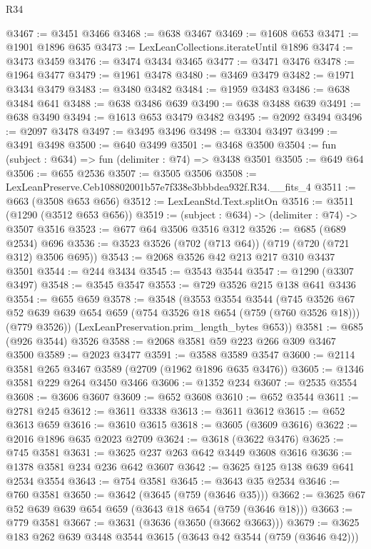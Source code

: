 \begin{lexlean}{R34}
\begin{coremodule}
@3467 := @3451 @3466
@3468 := @638 @3467
@3469 := @1608 @653
@3471 := @1901 @1896 @635
@3473 := LexLeanCollections.iterateUntil @1896
@3474 := @3473 @3459
@3476 := @3474 @3434 @3465
@3477 := @3471 @3476
@3478 := @1964 @3477
@3479 := @1961 @3478
@3480 := @3469 @3479
@3482 := @1971 @3434 @3479
@3483 := @3480 @3482
@3484 := @1959 @3483
@3486 := @638 @3484 @641
@3488 := @638 @3486 @639
@3490 := @638 @3488 @639
@3491 := @638 @3490
@3494 := @1613 @653 @3479 @3482
@3495 := @2092 @3494
@3496 := @2097 @3478
@3497 := @3495 @3496
@3498 := @3304 @3497
@3499 := @3491 @3498
@3500 := @640 @3499
@3501 := @3468 @3500
@3504 := fun (subject : @634) => fun (delimiter : @74) => @3438 @3501
@3505 := @649 @64
@3506 := @655 @2536
@3507 := @3505 @3506
@3508 := LexLeanPreserve.Ceb108802001b57e7f338e3bbbdea932f.R34.__fits_4
@3511 := @663 (@3508 @653 @656)
@3512 := LexLeanStd.Text.splitOn
@3516 := @3511 (@1290 (@3512 @653 @656))
@3519 := (subject : @634) -> (delimiter : @74) -> @3507 @3516
@3523 := @677 @64 @3506 @3516 @312
@3526 := @685 (@689 @2534) @696
@3536 := @3523 @3526 (@702 (@713 @64)) (@719 (@720 (@721 @312) @3506 @695))
@3543 := @2068 @3526 @42 @213 @217 @310 @3437 @3501
@3544 := @244 @3434
@3545 := @3543 @3544
@3547 := @1290 (@3307 @3497)
@3548 := @3545 @3547
@3553 := @729 @3526 @215 @138 @641 @3436
@3554 := @655 @659
@3578 := @3548
    (@3553
      @3554
      @3544
      (@745
        @3526
        @67
        @52
        @639
        @639
        @654
        @659
        (@754 @3526 @18 @654 (@759 (@760 @3526 @18)))
        (@779 @3526))
      (LexLeanPreservation.prim_length_bytes @653))
@3581 := @685 (@926 @3544) @3526
@3588 := @2068 @3581 @59 @223 @266 @309 @3467 @3500
@3589 := @2023 @3477
@3591 := @3588 @3589 @3547
@3600 := @2114 @3581 @265 @3467 @3589 (@2709 (@1962 @1896 @635 @3476))
@3605 := @1346 @3581 @229 @264 @3450 @3466
@3606 := @1352 @234
@3607 := @2535 @3554
@3608 := @3606 @3607
@3609 := @652 @3608
@3610 := @652 @3544
@3611 := @2781 @245
@3612 := @3611 @3338
@3613 := @3611 @3612
@3615 := @652 @3613 @659
@3616 := @3610 @3615
@3618 := @3605 (@3609 @3616)
@3622 := @2016 @1896 @635 @2023 @2709
@3624 := @3618 (@3622 @3476)
@3625 := @745 @3581
@3631 := @3625 @237 @263 @642 @3449 @3608 @3616
@3636 := @1378 @3581 @234 @236 @642 @3607
@3642 := @3625 @125 @138 @639 @641 @2534 @3554
@3643 := @754 @3581
@3645 := @3643 @35 @2534
@3646 := @760 @3581
@3650 := @3642 (@3645 (@759 (@3646 @35)))
@3662 := @3625 @67 @52 @639 @639 @654 @659 (@3643 @18 @654 (@759 (@3646 @18)))
@3663 := @779 @3581
@3667 := @3631 (@3636 (@3650 (@3662 @3663)))
@3679 := @3625 @183 @262 @639 @3448 @3544 @3615 (@3643 @42 @3544 (@759 (@3646 @42)))

\end{coremodule}
\end{lexlean}
